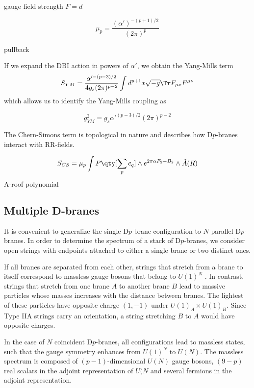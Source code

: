 gauge field strength $F=d $

\begin{equation}
  \mu_p = \frac{(\alpha')^{-(p+1)/2}}{(2\pi)^p}
\end{equation}

pullback

If we expand the DBI action in powers of $\alpha'$, we obtain the Yang-Mills term
\begin{equation}
  S_{YM} = \frac{\alpha'^{-(p-3)/2}}{4g_s (2\pi)^{p-2}} \int d^{p+1} x \sqrt {-g} \Tr F_{\mu\nu} F^{\mu\nu}
\end{equation}
which allows us to identify the Yang-Mills coupling as 

\begin{equation}
g^2_{YM} = g_s \alpha'^{(p-3)/2}(2\pi)^{p-2}
\end{equation}

The Chern-Simons term is topological in nature and describes how D$p$-branes interact with RR-fields.

\begin{equation}
S_{CS}= \mu_p \int P\qty[\sum_p c_q]\wedge e^{2\pi\alpha F_2 -B_2}\wedge \hat A (R)
\end{equation}
A-roof polynomial

\subsection{Multiple D-branes}

It is convenient to generalize the single D$p$-brane configuration to $N$ parallel D$p$-branes.
In order to determine the spectrum of a stack of D$p$-branes, we consider open strings with endpoints 
attached to either a single brane or two distinct ones.

If all branes are separated from each other, strings that stretch from a brane to itself correspond to massless gauge bosons that belong to $U(1)^N$ .
In contrast, strings that stretch from one brane $A$ to another brane $B$ lead to massive particles whose
masses increases with the distance between branes.
The lightest of these particles have opposite charge $(1,-1)$ under $U(1)_A \times U(1)_B$.
Since Type IIA strings carry an orientation, a string stretching $B$ to $A$ would have opposite charges.

In the case of $N$ coincident D$p$-branes, all configurations lead to massless states, such that the 
gauge symmetry enhances from $U(1)^N$ to $U(N)$.
The massless spectrum is composed of $(p-1)$-dimensional $U(N)$ gauge bosons, $(9-p)$ real
scalars in the adjoint representation of $U(N$ and several fermions in the adjoint representation.


